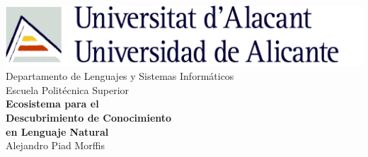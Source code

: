 \begin{titlepage}

\center %



\includegraphics[scale=.60]{./Images//Chapters/Cover/UA.jpg}\\[.5cm] %



{\Large Departamento de Lenguajes y Sistemas Inform{\'a}ticos}\\[0.25cm] %
{\Large Escuela Polit{\'e}cnica Superior}\\[2.0cm] %


{ \huge \bfseries Ecosistema para el}\\[0.3cm]
{ \huge \bfseries Descubrimiento de Conocimiento}\\[0.3cm]
{ \huge \bfseries en Lenguaje Natural}\\[1.5cm] %
 

{ \LARGE Alejandro Piad Morffis}\\[1.5cm]




\end{titlepage}
